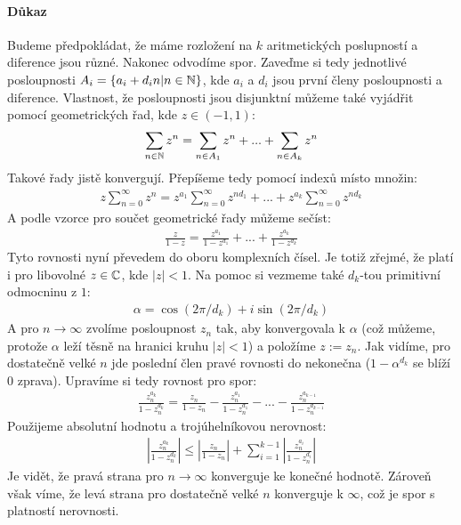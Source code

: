 \documentclass[a4paper,10pt]{article}
\begin{document}
\paragraph{Důkaz}
Budeme předpokládat, že máme rozložení na $k$ aritmetických poslupností a
diference jsou různé. Nakonec odvodíme spor. Zaveďme si tedy jednotlivé
posloupnosti $A_i = \{a_i + d_in | n \in \mathbb{N} \}$, kde $a_i$ a $d_i$ jsou první
členy posloupnosti a diference. Vlastnost, že posloupnosti jsou disjunktní
můžeme také vyjádřit pomocí geometrických řad, kde $z \in (-1, 1)$:
\begin{align}
	\sum_{n\in\mathbb{N}} z^n = \sum_{n\in A_1} z^n + ... + \sum_{n\in A_k} z^n
\end{align}
Takové řady jistě konvergují. Přepíšeme tedy pomocí indexů místo množin:
\begin{align}
	z\sum_{n=0}^\infty z^n = z^{a_1} \sum_{n=0}^\infty z^{nd_1} + ... + z^{a_k}
	\sum_{n=0}^\infty z^{nd_k}
\end{align}
A podle vzorce pro součet geometrické řady můžeme sečíst:
\begin{align}
	\frac{z}{1-z} = \frac{z^{a_1}}{1-z^{d_1}} + ... + \frac{z^{a_k}}{1-z^{d_k}} 
\end{align}
Tyto rovnosti nyní převedem do oboru komplexních čísel. Je totiž zřejmé, že
platí i pro libovolné $z  \in \mathbb{C}$, kde $|z| < 1$. Na pomoc si vezmeme také $d_k$-tou
primitivní odmocninu z $1$:
\begin{align}
	\alpha = \cos(2\pi/d_k) + i\sin(2\pi/d_k)
\end{align}
A pro $n\to\infty$ zvolíme posloupnost $z_n$ tak, aby konvergovala k $\alpha$
(což můžeme, protože $\alpha$ leží těsně na hranici kruhu $|z| < 1$) a položíme
$z := z_n$. Jak vidíme, pro dostatečně velké $n$ jde poslední člen pravé rovnosti do nekonečna
($1-\alpha^{d_k}$ se blíží 0 zprava). Upravíme si tedy rovnost pro spor:
\begin{align}
	\frac{z_n^{a_k}}{1-z_n^{d_k}} = \frac{z_n}{1-z_n} - \frac{z_n^{a_1}}{1-z_n^{d_1}} - ...
	- \frac{z_n^{a_{k-1}}}{1-z_n^{d_{k-1}}}
\end{align}
Použijeme absolutní hodnotu a trojúhelníkovou nerovnost:
\begin{align}
	\left| \frac{z_n^{a_k}}{1-z_n^{d_k}} \right| \le
	\left|\frac{z_n}{1-z_n}\right| + \sum_{i=1}^{k-1}
	\left|\frac{z_n^{a_i}}{1-z_n^{d_i}}\right|
\end{align}
Je vidět, že pravá strana pro $n\to\infty$ konverguje ke konečné hodnotě.
Zároveň však víme, že levá strana pro dostatečně velké $n$ konverguje k
$\infty$, což je spor s platností nerovnosti.
\end{document}
